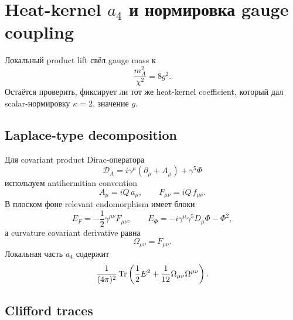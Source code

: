 \chapter{Heat-kernel \(a_4\) и нормировка gauge coupling}

Локальный product lift свёл gauge mass к
\begin{equation}
 \frac{m_A^2}{\chi^2}=8g^2.
\end{equation}
Остаётся проверить, фиксирует ли тот же heat-kernel coefficient, который
дал scalar-нормировку \(\kappa=2\), значение \(g\).

\section{Laplace-type decomposition}

Для covariant product Dirac-оператора
\begin{equation}
 \mathcal D_A
 =i\gamma^\mu(\partial_\mu+A_\mu)
 +\gamma^5\Phi
\end{equation}
используем antihermitian convention
\begin{equation}
 A_\mu=iQ\,a_\mu,
 \qquad
 F_{\mu\nu}=iQ\,f_{\mu\nu}.
\end{equation}
В плоском фоне relevant endomorphism имеет блоки
\begin{equation}
 E_F=-\frac12\gamma^{\mu\nu}F_{\mu\nu},
 \qquad
 E_\Phi=-i\gamma^\mu\gamma^5D_\mu\Phi-\Phi^2,
\end{equation}
а curvature covariant derivative равна
\begin{equation}
 \Omega_{\mu\nu}=F_{\mu\nu}.
\end{equation}
Локальная часть \(a_4\) содержит
\begin{equation}
 \frac1{(4\pi)^2}
 \operatorname{Tr}\left(
 \frac12E^2+\frac1{12}\Omega_{\mu\nu}\Omega^{\mu\nu}
 \right).
\end{equation}

\section{Clifford traces}

